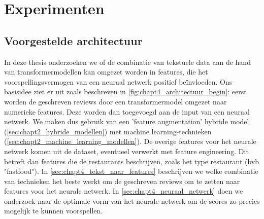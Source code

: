 \chapter{Experimenten}
\section{Voorgestelde architectuur}
In deze thesis onderzoeken we of de combinatie van tekstuele data aan de hand van transformermodellen kan omgezet worden in features, die het voorspellingsvermogen van een neuraal netwerk positief beïnvloeden. Ons basisidee ziet er uit zoals beschreven in \autoref{fig:chapt4_architectuur_begin}: eerst worden de geschreven reviews door een transformermodel omgezet naar numerieke features. Deze worden dan toegevoegd aan de input van een neuraal netwerk. We maken dus gebruik van een 'feature augmentation'  hybride model (\ref{sec:chapt2_hybride_modellen}) met machine learning-technieken (\ref{sec:chapt2_machine_learning_modellen}). De overige features voor het neurale netwerk komen uit de dataset, eventueel verwerkt met feature engineering. Dit betreft dan features die de restaurants beschrijven, zoals het type restaurant (bvb "fastfood"). In \autoref{sec:chapt4_tekst_naar_features} beschrijven we welke combinatie van technieken het beste werkt om de geschreven reviews om te zetten naar features voor het neurale netwerk. In \autoref{sec:chapt4_neuraal_netwerk} doen we onderzoek naar de optimale vorm van het neurale netwerk om de scores zo precies mogelijk te kunnen voorspellen.


